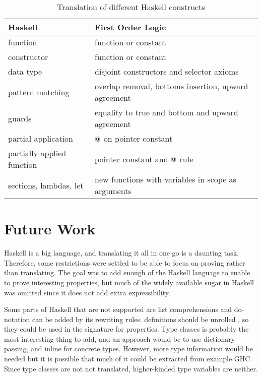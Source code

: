\begin{table}[h]
  \centering
  \begin{tabular}{|l|l|}
    \hline
    Haskell                    & First Order Logic \\
    \hline
    function                   & function or constant \\
    constructor                & function or constant \\
    data type                  & disjoint constructors and selector axioms \\
    pattern matching           & overlap removal, bottoms insertion, upward agreement \\
    guards                     & equality to true and bottom and upward agreement \\
    partial application        & $@$ on pointer constant \\
    partially applied function & pointer constant and $@$ rule \\
    sections, lambdas, let     & new functions with variables in scope as arguments \\
    \hline
  \end{tabular}
  \caption{Translation of different Haskell constructs
    \label{tab:transtable}
  }
\end{table}

%






\section{Future Work}

Haskell is a big language, and translating it all in one go is a
daunting task. Therefore, some restrictions were settled to be able to
focus on proving rather than translating.  The goal was to add enough
of the Haskell language to enable to prove interesting properties, but
much of the widely available sugar in Haskell was omitted since it
does not add extra expressibility.

Some parts of Haskell that are not supported are list
comprehensions and do-notation can be added by its rewriting rules.
 definitions should be unrolled , so they could be used in
the signature for properties. Type classes is probably the most
interesting thing to add, and an approach would be to use dictionary
passing, and inline for concrete types. However, more type information
would be needed but it is possible that much of it could be extracted
from example GHC. Since type classes are not not translated,
higher-kinded type variables are neither.

